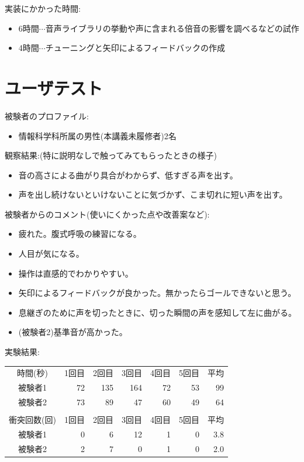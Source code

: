 \documentclass[a4j]{jarticle}
\begin{document}
実装にかかった時間:

\begin{itemize}
\item 6時間$\cdots$音声ライブラリの挙動や声に含まれる倍音の影響を調べるなどの試作
\item 4時間$\cdots$チューニングと矢印によるフィードバックの作成
\end{itemize}


\section{ユーザテスト}

被験者のプロファイル:
\begin{itemize}
\item 情報科学科所属の男性(本講義未履修者)2名
\end{itemize}

観察結果:(特に説明なしで触ってみてもらったときの様子)
\begin{itemize}
\item 音の高さによる曲がり具合がわからず、低すぎる声を出す。
\item 声を出し続けないといけないことに気づかず、こま切れに短い声を出す。
\end{itemize}

被験者からのコメント(使いにくかった点や改善案など):
\begin{itemize}
\item 疲れた。腹式呼吸の練習になる。
\item 人目が気になる。
\item 操作は直感的でわかりやすい。
\item 矢印によるフィードバックが良かった。無かったらゴールできないと思う。
\item 息継ぎのために声を切ったときに、切った瞬間の声を感知して左に曲がる。
\item (被験者2)基準音が高かった。
\end{itemize}

実験結果:

\begin{table}[htb]
  \begin{tabular}{crrrrrr}
時間(秒)    & 1回目 & 2回目 & 3回目 & 4回目& 5回目 &平均\\
被験者1 & 72 & 135 & 164 & 72 & 53 & 99\\
被験者2 & 73 & 89 & 47 & 60 & 49 & 64\\
\\
衝突回数(回)    & 1回目 & 2回目 & 3回目 & 4回目& 5回目 & 平均\\
被験者1 & 0 & 6 & 12 & 1 & 0 & 3.8\\
被験者2 & 2 & 7 & 0 & 1 & 0& 2.0\\
  \end{tabular}
\end{table}
\end{document}

